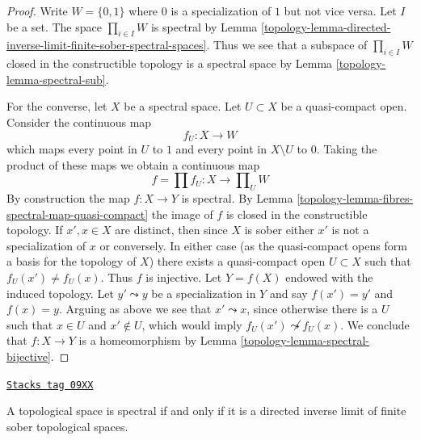 \begin{proof}

Write $W = \{0, 1\}$ where $0$ is a specialization of $1$ but not vice versa.
Let $I$ be a set. The space $\prod_{i \in I} W$ is spectral by
Lemma \ref{topology-lemma-directed-inverse-limit-finite-sober-spectral-spaces}.
Thus we see that a subspace of $\prod_{i \in I} W$ closed in the
constructible topology is
a spectral space by Lemma \ref{topology-lemma-spectral-sub}.

\medskip\noindent
For the converse, let $X$ be a spectral space. Let $U \subset X$ be a
quasi-compact open. Consider the continuous map
$$
f_U : X \longrightarrow W
$$
which maps every point in $U$ to $1$ and every point in $X \setminus U$ to $0$.
Taking the product of these maps we obtain a continuous map
$$
f = \prod f_U : X \longrightarrow \prod\nolimits_U W
$$
By construction the map $f : X \to Y$ is spectral. By
Lemma \ref{topology-lemma-fibres-spectral-map-quasi-compact}
the image of $f$ is closed in the constructible topology.
If $x', x \in X$ are distinct, then since $X$ is sober either $x'$
is not a specialization of $x$ or conversely. In either case (as the
quasi-compact opens form a basis for the topology of $X$) there
exists a quasi-compact open $U \subset X$ such that $f_U(x') \not = f_U(x)$.
Thus $f$ is injective. Let $Y = f(X)$ endowed with the induced topology.
Let $y' \leadsto y$ be a specialization in $Y$ and say
$f(x') = y'$ and $f(x) = y$. Arguing as above we see that
$x' \leadsto x$, since otherwise there is a $U$ such that
$x \in U$ and $x' \not \in U$, which would imply
$f_U(x') \not \leadsto f_U(x)$.
We conclude that $f : X \to Y$ is a homeomorphism by
Lemma \ref{topology-lemma-spectral-bijective}.
\end{proof}

\begin{lemma}
\label{topology-lemma-spectral-inverse-limit-finite-sober-spaces}
\href{https://stacks.math.columbia.edu/tag/09XX}{\texttt{Stacks tag 09XX}}

A topological space is spectral if and only if it is a directed
inverse limit of finite sober topological spaces.
\end{lemma}


